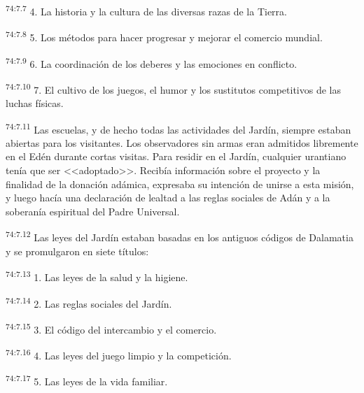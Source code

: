 \par
\textsuperscript{74:7.7} 4. La historia y la cultura de las diversas razas de la Tierra.

\par
\textsuperscript{74:7.8} 5. Los métodos para hacer progresar y mejorar el comercio mundial.

\par
\textsuperscript{74:7.9} 6. La coordinación de los deberes y las emociones en conflicto.

\par
\textsuperscript{74:7.10} 7. El cultivo de los juegos, el humor y los sustitutos competitivos de las luchas físicas.

\par
\textsuperscript{74:7.11} Las escuelas, y de hecho todas las actividades del Jardín, siempre estaban abiertas para los visitantes. Los observadores sin armas eran admitidos libremente en el Edén durante cortas visitas. Para residir en el Jardín, cualquier urantiano tenía que ser <<adoptado>>. Recibía información sobre el proyecto y la finalidad de la donación adámica, expresaba su intención de unirse a esta misión, y luego hacía una declaración de lealtad a las reglas sociales de Adán y a la soberanía espiritual del Padre Universal.

\par
\textsuperscript{74:7.12} Las leyes del Jardín estaban basadas en los antiguos códigos de Dalamatia y se promulgaron en siete títulos:

\par
\textsuperscript{74:7.13} 1. Las leyes de la salud y la higiene.

\par
\textsuperscript{74:7.14} 2. Las reglas sociales del Jardín.

\par
\textsuperscript{74:7.15} 3. El código del intercambio y el comercio.

\par
\textsuperscript{74:7.16} 4. Las leyes del juego limpio y la competición.

\par
\textsuperscript{74:7.17} 5. Las leyes de la vida familiar.

